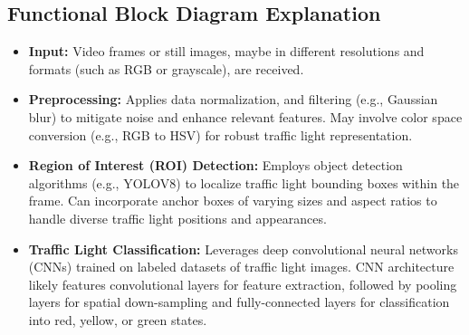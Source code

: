 \documentclass[12 pt]{report}
\begin{document}
\subsection{Functional Block Diagram Explanation}
{
  \begin{justify}
  \begin{itemize}
    \item \textbf{Input:} Video frames or still images, maybe in different resolutions and formats (such as RGB or grayscale), are received.

    \item \textbf{Preprocessing:} Applies data normalization, and filtering (e.g., Gaussian blur) to mitigate noise and enhance relevant features. May involve color space conversion (e.g., RGB to HSV) for robust traffic light representation.

    \item \textbf{Region of Interest (ROI) Detection:} Employs object detection algorithms (e.g., YOLOV8) to localize traffic light bounding boxes within the frame. Can incorporate anchor boxes of varying sizes and aspect ratios to handle diverse traffic light positions and appearances.

    \item \textbf{Traffic Light Classification:} Leverages deep convolutional neural networks (CNNs) trained on labeled datasets of traffic light images. CNN architecture likely features convolutional layers for feature extraction, followed by pooling layers for spatial down-sampling and fully-connected layers for classification into red, yellow, or green states.
  \end{itemize}
  \end{justify}
}
\end{document}
